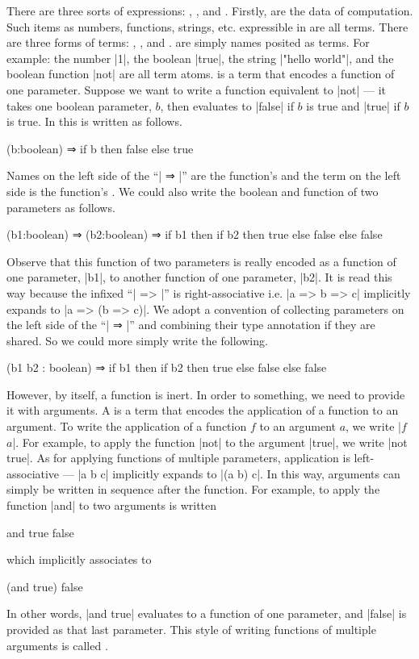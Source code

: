 There are three sorts of expressions: , , and .
Firstly,  are the data of computation.
Such items as numbers, functions, strings, etc. expressible in \LangA are all terms.
There are three forms of terms: , , and .
 are simply names posited as terms.
For example: the number \code|1|, the boolean \code|true|, the string \code|"hello world"|, and the boolean function \code|not| are all term atoms.
 is a term that encodes a function of one parameter.
Suppose we want to write a function equivalent to \code|not| ---
it takes one boolean parameter, $b$, then evaluates to \code|false| if $b$ is true and \code|true| if $b$ is true.
In \LangA this is written as follows.
%
\begin{snippet}
(b:boolean) ⇒ if b then false else true
\end{snippet}
%
Names on the left side of the ``\code| ⇒ |'' are the function's  and the term on the left side is the function's .
We could also write the boolean and function of two parameters as follows.
%
\begin{snippet}
(b1:boolean) ⇒
  (b2:boolean) ⇒
    if b1
      then if b2 then true else false
      else false
\end{snippet}
%
Observe that this function of two parameters is really encoded as a function of one parameter, \code|b1|, to another function of one parameter, \code|b2|.
It is read this way because the infixed ``\code| => |'' is right-associative i.e. \code|a => b => c| implicitly expands to \code|a => (b => c)|.
We adopt a convention of collecting parameters on the left side of the ``\code| ⇒ |'' and combining their type annotation if they are shared.
So we could more simply write the following.
%
\begin{snippet}
(b1 b2 : boolean) ⇒
  if b1
    then if b2 then true else false
    else false
\end{snippet}
%

However, by itself, a function is inert.
In order to  something, we need to provide it with arguments.
A  is a term that encodes the application of a function to an argument.
To write the application of a function $f$ to an argument $a$, we write \code|$f$ $a$|.
For example, to apply the function \code|not| to the argument \code|true|, we write \code|not true|.
As for applying functions of multiple parameters, application is left-associative --- \code|a b c| implicitly expands to \code|(a b) c|.
In this way, arguments can simply be written in sequence after the function.
For example, to apply the function \code|and| to two arguments is written
%
\begin{snippet}
and true false
\end{snippet}
%
which implicitly associates to
%
\begin{snippet}
(and true) false
\end{snippet}
%
In other words, \code|and true| evaluates to a function of one parameter, and \code|false| is provided as that last parameter.
This style of writing functions of multiple arguments is called .

